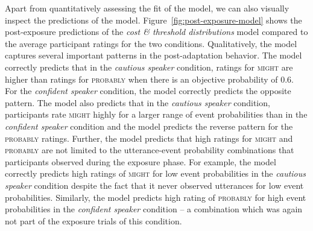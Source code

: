 \documentclass[lucida,biblatex]{sp} %
\begin{document}
Apart from quantitatively assessing the fit of the model, we can also visually inspect the predictions of the model. 
Figure~\ref{fig:post-exposure-model} shows the post-exposure predictions of the \textit{cost \& threshold distributions} model compared to the average participant ratings for the two conditions. Qualitatively, 
the model captures several important patterns in the post-adaptation behavior. The model correctly predicts that in the \textit{cautious speaker} condition, ratings for \textsc{might} are 
higher than ratings for \textsc{probably} when there is an objective probability of 0.6. For the \textit{confident speaker} condition, the model correctly predicts the
opposite pattern. The model also predicts that in the \textit{cautious speaker} condition, participants rate \textsc{might} highly for a larger range of event probabilities than
in the \textit{confident speaker} condition and the model predicts the  reverse pattern for the \textsc{probably} ratings. Further, the model predicts that high ratings for \textsc{might} 
and \textsc{probably} are not limited to the utterance-event probability combinations that participants observed during the exposure phase. For example, the model correctly predicts
high ratings of \textsc{might} for low event probabilities in the \textit{cautious speaker} condition despite the fact that it never observed utterances for low event probabilities. Similarly,
the model predicts high rating of \textsc{probably} for high event probabilities in the \textit{confident speaker} condition -- a combination which was again not part of the exposure trials
of this condition.
\end{document}
